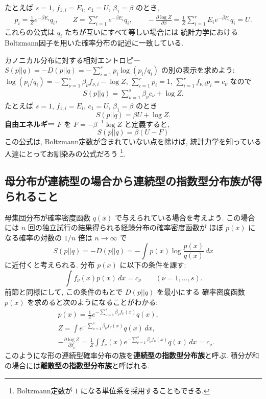 \documentclass[12pt,twoside]{jarticle}
\renewcommand\d{\partial}
\theoremstyle{jplain}
\theoremstyle{jplain}
\theoremstyle{jplain}
\numberwithin{theorem}{section}
\numberwithin{equation}{section}
\numberwithin{figure}{section}
\numberwithin{table}{section}
\begin{document}
たとえば $s=1$, $f_{1,i}=E_i$, $c_1=U$, $\beta_1=\beta$ のとき, 
\begin{align*}
p_i = \frac{1}{Z}e^{-\beta E_i}q_i,
\qquad
Z = \sum_{i=1}^r e^{-\beta E_i}q_i,
\qquad
-\frac{\d\log Z}{\d\beta} 
= \frac{1}{Z} \sum_{i=1}^r E_i e^{-\beta E_i}q_i = U.
\end{align*}
これらの公式は $q_i$ たちが互いにすべて等しい場合には
統計力学におけるBoltzmann因子を用いた確率分布の記述に一致している.

カノニカル分布に対する相対エントロピー $S(p||q)=-D(p||q)=-\sum_{i=1}^r p_i\log(p_i/q_i)$
の別の表示を求めよう: 
$\log(p_i/q_i)=-\sum_{\nu=1}^s\beta_\nu f_{\nu,i}-\log Z$, $\sum_{i=1}^r p_i=1$,
$\sum_{i=1}^r f_{\nu,i}p_i=c_\nu$ なので
\begin{align*}
S(p||q) = \sum_{\nu=1}^s \beta_\nu c_\nu + \log Z.
\end{align*}
たとえば $s=1$, $f_{1,i}=E_i$, $c_1=U$, $\beta_1=\beta$ のとき
\[
S(p||q) = \beta U + \log Z.
\]
{\bf 自由エネルギー} $F$ を $F=-\beta^{-1}\log Z$ と定義すると,
\[
S(p||q) = \beta(U-F)
\]
この公式は, Boltzmann定数が含まれていない点を除けば,
統計力学を知っている人達にとってお馴染みの公式だろう%
\footnote{Boltzmann定数が $1$ になる単位系を採用することもできる.}.



\subsection{母分布が連続型の場合から連続型の指数型分布族が得られること}

母集団分布が確率密度函数 $q(x)$ で与えられている場合を考えよう.
この場合には $n$ 回の独立試行の結果得られる経験分布の確率密度函数が
ほぼ $p(x)$ になる確率の対数の $1/n$ 倍は $n\to\infty$ で
\[
S(p||q)=-D(p||q) = -\int p(x)\log\frac{p(x)}{q(x)}\,dx
\]
に近付くと考えられる. 分布 $p(x)$ に以下の条件を課す:
\[
\int f_\nu(x)p(x)\,dx = c_\nu
\qquad (\nu=1,\ldots,s).
\]
前節と同様にして, この条件のもとで $D(p||q)$ を最小にする
確率密度函数 $p(x)$ を求めると次のようになることがわかる:
\begin{align*}
&
p(x)=\frac{1}{Z}e^{-\sum_{\nu=1}^s \beta_\nu f_\nu(x)}q(x), 
\\ &
Z=\int e^{-\sum_{\nu=1}^s \beta_\nu f_\nu(x)}q(x)\,dx,
\\ &
-\frac{\d\log Z}{\d\beta_\nu} 
= \frac{1}{Z}\int f_\nu(x) e^{-\sum_{\nu=1}^s \beta_\nu f_\nu(x)}q(x) \,dx
= c_\nu.
\end{align*}
このようにな形の連続型確率分布の族を{\bf 連続型の指数型分布族}と呼ぶ.
積分が和の場合には{\bf 離散型の指数型分布族}と呼ばれる.
\end{document}
